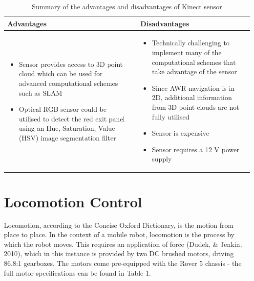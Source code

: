 \documentclass[a4paper]{article}
\begin{document}
\begin{table}[h]
\centering
\caption{Summary of the advantages and disadvantages of Kinect sensor} \footnotesize
\begin{tabular}{p{7.5cm}p{0.1cm}p{7.5cm}}
\toprule
\textbf{Advantages} & & \textbf{Disadvantages}\\
\midrule
\begin{itemize}[leftmargin=0.3cm] \item Sensor provides access to 3D point cloud which can be used for advanced computational schemes such as SLAM \item Optical RGB sensor could be utilised to detect the red exit panel using an Hue, Saturation, Value (HSV) image segmentation filter \end{itemize} & & \begin{itemize}[leftmargin=0.3cm] \item Technically challenging to implement many of the computational schemes that take advantage of the sensor \item Since AWR navigation is in 2D, additional information from 3D point clouds are not fully utilised \item Sensor is expensive \item Sensor requires a 12 $\si{\volt}$ power supply\end{itemize}\\
\bottomrule
\end{tabular}
\end{table}

\newpage

\section{Locomotion Control}
Locomotion, according to the Concise Oxford Dictionary, is the motion from place to place. In the context of a mobile robot, locomotion is the process by which the robot moves. This requires an application of force (Dudek, \& Jenkin, 2010), which in this instance is provided by two DC brushed motors, driving 86.8:1 gearboxes. The motors come pre-equipped with the Rover 5 chassis - the full motor specifications can be found in Table 1. 
\end{document}
